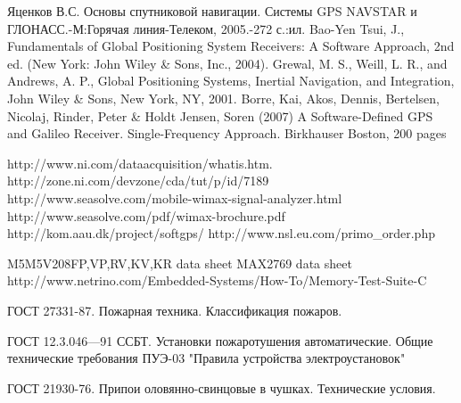
\begin{thebibliography}{99}
 Яценков В.С. Основы спутниковой навигации. Системы GPS NAVSTAR и ГЛОНАСС.-М:Горячая линия-Телеком, 2005.-272 с.:ил.
 Bao-Yen Tsui, J., Fundamentals of Global Positioning System Receivers: A Software Approach, 2nd ed. (New York: John Wiley \& Sons, Inc., 2004).
 Grewal, M. S., Weill, L. R., and Andrews, A. P., Global Positioning Systems, Inertial Navigation, and Integration, John Wiley \& Sons, New York, NY, 2001.
 Borre, Kai, Akos, Dennis, Bertelsen, Nicolaj, Rinder, Peter \& Holdt Jensen, Soren (2007) A Software-Defined GPS and Galileo Receiver. Single-Frequency Approach. Birkhauser Boston, 200 pages

 http://www.ni.com/dataacquisition/whatis.htm.
 http://zone.ni.com/devzone/cda/tut/p/id/7189
 http://www.seasolve.com/mobile-wimax-signal-analyzer.html
 http://www.seasolve.com/pdf/wimax-brochure.pdf
 http://kom.aau.dk/project/softgps/
 http://www.nsl.eu.com/primo\_order.php

 M5M5V208FP,VP,RV,KV,KR data sheet
 MAX2769 data sheet
 http://www.netrino.com/Embedded-Systems/How-To/Memory-Test-Suite-C

 ГОСТ 27331-87. Пожарная техника. Классификация пожаров.

 ГОСТ 12.3.046—91 ССБТ. Установки пожаротушения автоматические. Общие технические требования 
 ПУЭ-03 "Правила устройства электроустановок"

 ГОСТ 21930-76. Припои оловянно-свинцовые в чушках. Технические условия.
\end{thebibliography}
